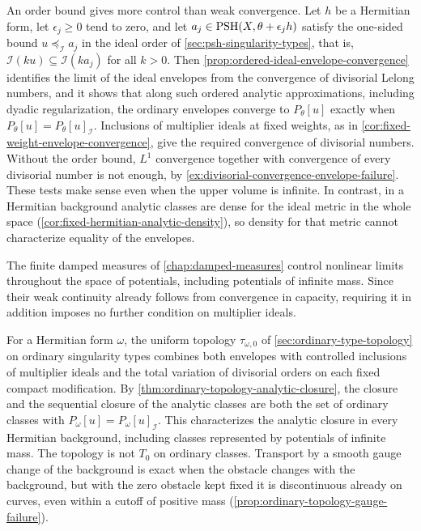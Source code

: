 An order bound gives more control than weak convergence. Let $h$ be a Hermitian form, let $\epsilon_j\geq0$ tend to zero, and let $a_j\in\mathrm{PSH}(X,\theta+\epsilon_jh)$ satisfy the one-sided bound $u\preceq_{\mathcal I}a_j$ in the ideal order of \cref{sec:psh-singularity-types}, that is, $\mathcal I(ku)\subseteq\mathcal I(ka_j)$ for all $k>0$. Then \cref{prop:ordered-ideal-envelope-convergence} identifies the limit of the ideal envelopes from the convergence of divisorial Lelong numbers, and it shows that along such ordered analytic approximations, including dyadic regularization, the ordinary envelopes converge to $P_\theta[u]$ exactly when $P_\theta[u]=P_\theta[u]_{\mathcal I}$. Inclusions of multiplier ideals at fixed weights, as in \cref{cor:fixed-weight-envelope-convergence}, give the required convergence of divisorial numbers. Without the order bound, $L^1$ convergence together with convergence of every divisorial number is not enough, by \cref{ex:divisorial-convergence-envelope-failure}. These tests make sense even when the upper volume is infinite. In contrast, in a Hermitian background analytic classes are dense for the ideal metric in the whole space (\cref{cor:fixed-hermitian-analytic-density}), so density for that metric cannot characterize equality of the envelopes.

The finite damped measures of \cref{chap:damped-measures} control nonlinear limits throughout the space of potentials, including potentials of infinite mass. Since their weak continuity already follows from convergence in capacity, requiring it in addition imposes no further condition on multiplier ideals.

For a Hermitian form $\omega$, the uniform topology $\tau_{\omega,0}$ of \cref{sec:ordinary-type-topology} on ordinary singularity types combines both envelopes with controlled inclusions of multiplier ideals and the total variation of divisorial orders on each fixed compact modification. By \cref{thm:ordinary-topology-analytic-closure}, the closure and the sequential closure of the analytic classes are both the set of ordinary classes with $P_\omega[u]=P_\omega[u]_{\mathcal I}$. This characterizes the analytic closure in every Hermitian background, including classes represented by potentials of infinite mass. The topology is not $T_0$ on ordinary classes. Transport by a smooth gauge change of the background is exact when the obstacle changes with the background, but with the zero obstacle kept fixed it is discontinuous already on curves, even within a cutoff of positive mass (\cref{prop:ordinary-topology-gauge-failure}).

